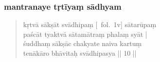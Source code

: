 \documentclass[12pt]{article}
\begin{document}
% 
 
\subsubsection{mantranaye tṛtīyaṃ sādhyam}
\begin{quote}
	kṛtvā sākṣāt svādhipaṃ [\MS\ fol.\ 1v] sātarūpaṃ \\
	paścāt tyaktvā sātamātraṃ phalaṃ syāt |\\
	śuddhaṃ sākṣāc chakyate naiva kartuṃ \\
	tenākāro bhāvitaḥ svādhipasya || 10 ||

% 
\end{quote}
\end{document}
